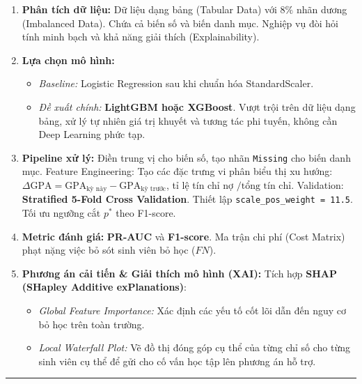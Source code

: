 \documentclass[10pt,a4paper]{article}
\begin{document}
\begin{enumerate}[leftmargin=*]
    \item \textbf{Phân tích dữ liệu:} Dữ liệu dạng bảng (Tabular Data) với $8\%$ nhãn dương (Imbalanced Data). Chứa cả biến số và biến danh mục. Nghiệp vụ đòi hỏi tính minh bạch và khả năng giải thích (Explainability).
    \item \textbf{Lựa chọn mô hình:}
    \begin{itemize}
        \item \textit{Baseline:} Logistic Regression sau khi chuẩn hóa StandardScaler.
        \item \textit{Đề xuất chính:} \textbf{LightGBM hoặc XGBoost}. Vượt trội trên dữ liệu dạng bảng, xử lý tự nhiên giá trị khuyết và tương tác phi tuyến, không cần Deep Learning phức tạp.
    \end{itemize}
    \item \textbf{Pipeline xử lý:} Điền trung vị cho biến số, tạo nhãn \texttt{Missing} cho biến danh mục. Feature Engineering: Tạo các đặc trưng vi phân biểu thị xu hướng: $\Delta \text{GPA} = \text{GPA}_{\text{kỳ này}} - \text{GPA}_{\text{kỳ trước}}$, tỉ lệ tín chỉ nợ $/ \text{tổng tín chỉ}$. Validation: \textbf{Stratified 5-Fold Cross Validation}. Thiết lập \texttt{scale\_pos\_weight = 11.5}. Tối ưu ngưỡng cắt $p^*$ theo F1-score.
    \item \textbf{Metric đánh giá:} \textbf{PR-AUC} và \textbf{F1-score}. Ma trận chi phí (Cost Matrix) phạt nặng việc bỏ sót sinh viên bỏ học ($FN$).
    \item \textbf{Phương án cải tiến \& Giải thích mô hình (XAI):} Tích hợp \textbf{SHAP (SHapley Additive exPlanations)}:
    \begin{itemize}
        \item \textit{Global Feature Importance:} Xác định các yếu tố cốt lõi dẫn đến nguy cơ bỏ học trên toàn trường.
        \item \textit{Local Waterfall Plot:} Vẽ đồ thị đóng góp cụ thể của từng chỉ số cho từng sinh viên cụ thể để gửi cho cố vấn học tập lên phương án hỗ trợ.
    \end{itemize}
\end{enumerate}

\vspace{1em}
\hrule
\vspace{0.8em}

\newpage
\end{document}
